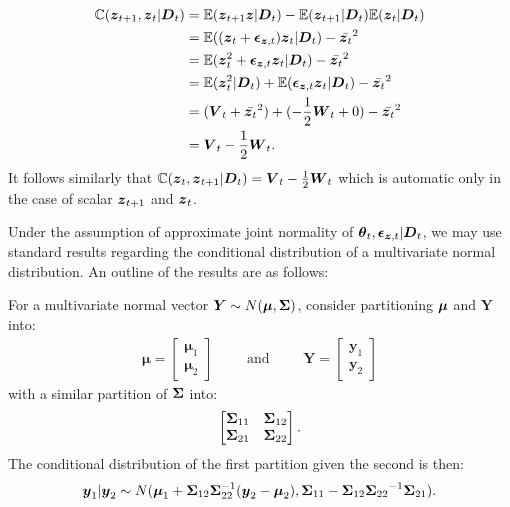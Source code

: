 \begin{align}
\mathbb{C}(\boldsymbol{z}_{t+1}, \boldsymbol{z}_t | \boldsymbol{D}_t)
&= \mathbb{E}(\boldsymbol{z}_{t+1} \boldsymbol{z} | \boldsymbol{D}_t) - \mathbb{E}(\boldsymbol{z}_{t+1} | \boldsymbol{D}_t)\mathbb{E}(\boldsymbol{z}_t | \boldsymbol{D}_t) \notag \\
&= \mathbb{E}((\boldsymbol{z}_t + \boldsymbol{\epsilon}_{\boldsymbol{z}, t}) \boldsymbol{z}_t | \boldsymbol{D}_t) - \bar{\boldsymbol{z}_t}^2 \notag \\
&= \mathbb{E}(\boldsymbol{z}_t^2 + \boldsymbol{\epsilon}_{\boldsymbol{z}, t} \boldsymbol{z}_t | \boldsymbol{D}_t) - \bar{\boldsymbol{z}_t}^2 \notag \\
&= \mathbb{E}(\boldsymbol{z}_t^2 | \boldsymbol{D}_t) + \mathbb{E}(\boldsymbol{\epsilon}_{\boldsymbol{z}, t} \boldsymbol{z}_t | \boldsymbol{D}_t) - \bar{\boldsymbol{z}_t}^2 \notag \\
&= (\boldsymbol{V}_t + \bar{\boldsymbol{z}_t}^2) + (-\frac{1}{2} \boldsymbol{W}_t + 0) - \bar{\boldsymbol{z}_t}^2 \notag \\
&= \boldsymbol{V}_t -\frac{1}{2} \boldsymbol{W}_t.
\end{align}
It follows similarly that \(\mathbb{C}(\boldsymbol{z}_t, \boldsymbol{z}_{t+1} | \boldsymbol{D}_t) = \boldsymbol{V}_t -\frac{1}{2} \boldsymbol{W}_t\) which is
automatic only in the case of scalar \(\boldsymbol{z}_{t+1}\) and \(\boldsymbol{z}_t\). 

Under the assumption of approximate joint normality of \(\boldsymbol{\theta}_t, \boldsymbol{\epsilon}_{\boldsymbol{z}, t} | \boldsymbol{D}_t\), we
may use standard results regarding the conditional distribution of a multivariate normal distribution. An outline of the
results are as follows: 

For a multivariate normal vector \(\boldsymbol{Y} \sim N(\boldsymbol{\mu}, \boldsymbol{\Sigma})\), consider partitioning
\(\boldsymbol{\mu}\) and \(\boldsymbol{Y}\) into:
\begin{equation}
\begin{aligned}
\boldsymbol\mu =
\begin{bmatrix}
 \boldsymbol\mu_1 \\
 \boldsymbol\mu_2
\end{bmatrix}
\end{aligned}
\qquad \text{and} \qquad
\begin{aligned}
\boldsymbol{Y}=
\begin{bmatrix}
\boldsymbol{y}_1 \\ 
\boldsymbol{y}_2 
\end{bmatrix}
\end{aligned}
\end{equation}
with a similar partition of \(\boldsymbol{\Sigma}\) into:
\begin{align} 
\begin{bmatrix}
\boldsymbol{\Sigma}_{11} & \boldsymbol{\Sigma}_{12} \\
\boldsymbol{\Sigma}_{21} & \boldsymbol{\Sigma}_{22}
\end{bmatrix}.
\end{align}
The conditional distribution of the first partition given the second is then: 
\begin{align} 
\boldsymbol{y}_1 | \boldsymbol{y}_2 \sim
N(\boldsymbol{\mu}_1 + \boldsymbol{\Sigma}_{12} \boldsymbol{\Sigma}_{22}^{-1} (\boldsymbol{y}_2 - \boldsymbol{\mu}_2), 
\boldsymbol{\Sigma}_{11} - \boldsymbol{\Sigma}_{12}{\boldsymbol{\Sigma}_{22}}^{-1} \boldsymbol{\Sigma}_{21}).
\end{align}

